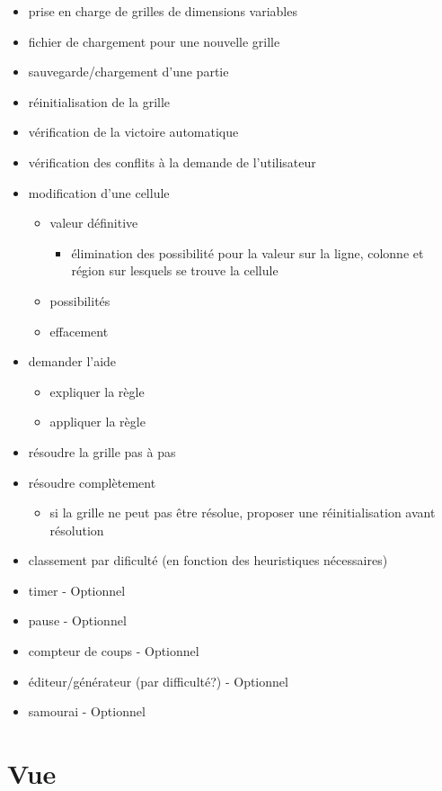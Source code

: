 \documentclass[a4paper,10pt]{report}
\begin{document}
\begin{itemize}
 \item prise en charge de grilles de dimensions variables
 \item fichier de chargement pour une nouvelle grille
 \item sauvegarde/chargement d'une partie
 \item réinitialisation de la grille
 \item vérification de la victoire automatique
 \item vérification des conflits à la demande de l'utilisateur
 \item modification d'une cellule
 \begin{itemize}
  \item valeur définitive
  \begin{itemize}
   \item élimination des possibilité pour la valeur sur
   la ligne, colonne et région sur lesquels se trouve la cellule
  \end{itemize}
  \item possibilités
  \item effacement
 \end{itemize}
 \item demander l'aide
 \begin{itemize}
  \item expliquer la règle
  \item appliquer la règle
 \end{itemize}
 \item résoudre la grille pas à pas
 \item résoudre complètement
 \begin{itemize}
  \item si la grille ne peut pas être résolue,
  proposer une réinitialisation avant résolution
 \end{itemize}
 \item classement par dificulté (en fonction des heuristiques nécessaires)
 \item timer - Optionnel
 \item pause - Optionnel
 \item compteur de coups - Optionnel
 \item éditeur/générateur (par difficulté?) - Optionnel
 \item samourai - Optionnel
\end{itemize}

\section*{Vue}
\end{document}

